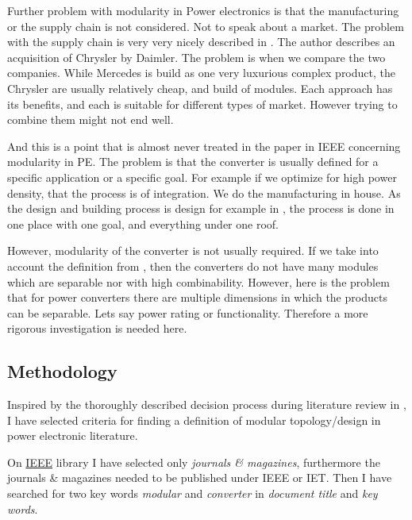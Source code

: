 \documentclass[]{scrartcl}
\begin{document}
Further problem with modularity in Power electronics is that the manufacturing or the supply chain is not considered. Not to speak about a market. The problem with the supply chain is very very nicely described in \cite{Fine2005}. The author describes an acquisition of Chrysler by Daimler. The problem is when we compare the two companies. While Mercedes is build as one very luxurious complex product, the Chrysler are usually relatively cheap, and build of modules. Each approach has its benefits, and each is suitable for different types of market. However trying to combine them might not end well. 

And this is a point that is almost never treated in the paper in IEEE concerning modularity in PE. The problem is that the converter is usually defined for a specific application or a specific goal. For example if we optimize for high power density, that the process is of integration. We do the manufacturing in house. As the design and building process is design for example in \cite{Abraham2005}, the process is done in one place with one goal, and everything under one roof. 

However, modularity of the converter is not usually required. If we take into account the definition from \cite{Salvador2007}, then the converters do not have many modules which are separable nor with high combinability. However, here is the problem that for power converters there are multiple dimensions in which the products can be separable. Lets say power rating or functionality. Therefore a more rigorous investigation is needed here. 





\subsection{Methodology}
Inspired by the thoroughly described decision process during literature review in \cite{Salvador2007}, I have selected criteria for finding a definition of modular topology/design in power electronic literature. 

On \href{<http://ieeexplore.ieee.org/Xplore/home.jsp>}{IEEE} library I have selected only \emph{journals \& magazines}, furthermore the journals \& magazines needed to be published under IEEE or IET.  Then I have searched for two key words \emph{modular} and \emph{converter} in \emph{document title} and \emph{key words}. 
\end{document}
